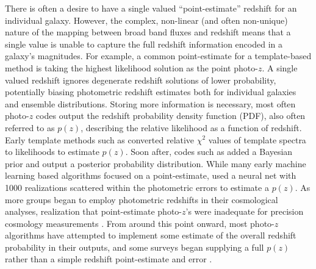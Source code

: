 \documentclass[usenatbib]{mn2e}
\newcommand{\red}[1]{\textcolor{red}{#1}}
\newcommand{\aim}[1]{\textcolor{green}{#1}}%
\newcommand{\scc}[1]{\textcolor{scc}{#1}}%
\begin{document}
There is often a desire to have a single valued ``point-estimate'' redshift for an individual galaxy.  However, the complex, non-linear (and often non-unique) nature of the mapping between broad band fluxes and redshift means that a single value is unable to capture the full redshift information encoded in a galaxy's magnitudes.  For example, a common point-estimate for a template-based method is taking the highest likelihood solution as the point photo-$z$.  A single valued redshift ignores degenerate redshift solutions of lower probability, potentially biasing photometric redshift estimates both for individual galaxies and ensemble distributions.  Storing more information is necessary, most often photo-$z$ codes output the redshift probability density function (PDF), also often referred to as $p(z)$, describing the relative likelihood as a function of redshift. %
Early template methods such as \citet{Fernandezsoto:99} converted relative $\chi^2$ values of template spectra to likelihoods to estimate $p(z)$.  Soon after, codes such as \citet{Benitez:00} added a Bayesian prior and output a posterior probability distribution.  While many early machine learning based algorithms focused on a point-estimate, \citet{Firth:03} used a neural net with 1000 realizations scattered within the photometric errors to estimate a $p(z)$. 
As more groups began to employ photometric redshifts in their cosmological analyses, realization that point-estimate photo-$z$'s were inadequate for precision cosmology measurements \citep{Mandelbaum:2008}.  From around this point onward, most photo-$z$ algorithms have attempted to implement some estimate of the overall redshift probability in their outputs, and some surveys began supplying a full $p(z)$ rather than a simple redshift point-estimate and error \citep[e.~g.~][]{de_Jong:17}.

\end{document}
